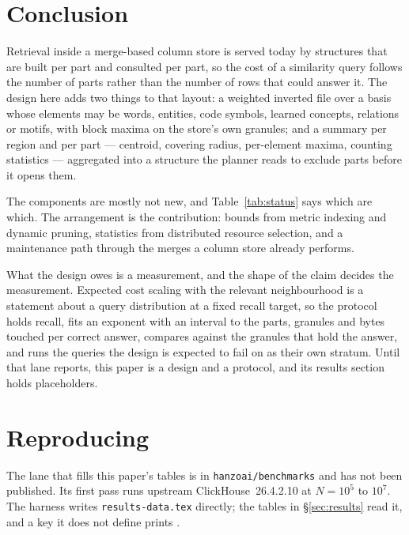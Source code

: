 \section{Conclusion}
\label{sec:conclusion}

Retrieval inside a merge-based column store is served today by structures that
are built per part and consulted per part, so the cost of a similarity query
follows the number of parts rather than the number of rows that could answer
it. The design here adds two things to that layout: a weighted inverted file
over a basis whose elements may be words, entities, code symbols, learned
concepts, relations or motifs, with block maxima on the store's own granules;
and a summary per region and per part --- centroid, covering radius, per-element
maxima, counting statistics --- aggregated into a structure the planner reads
to exclude parts before it opens them.

The components are mostly not new, and Table~\ref{tab:status} says which are
which. The arrangement is the contribution: bounds from metric indexing and
dynamic pruning, statistics from distributed resource selection, and a
maintenance path through the merges a column store already performs.

What the design owes is a measurement, and the shape of the claim decides the
measurement. Expected cost scaling with the relevant neighbourhood is a
statement about a query distribution at a fixed recall target, so the protocol
holds recall, fits an exponent with an interval to the parts, granules and
bytes touched per correct answer, compares against the granules that hold the
answer, and runs the queries the design is expected to fail on as their own
stratum. Until that lane reports, this paper is a design and a protocol, and
its results section holds placeholders.

\section*{Reproducing}

The lane that fills this paper's tables is in \texttt{hanzoai/benchmarks} and
has not been published. Its first pass runs upstream ClickHouse~26.4.2.10 at
$N = 10^5$ to $10^7$. The harness writes \texttt{results-data.tex} directly; the
tables in \S\ref{sec:results} read it, and a key it does not define prints
\ph{}.
